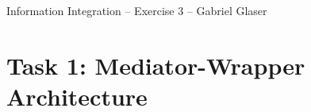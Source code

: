 \documentclass{scrartcl}
\begin{document}
	\begin{center}
		\LARGE
		Information Integration -- Exercise 3 -- Gabriel Glaser
	\end{center}
	
	\section*{Task 1: Mediator-Wrapper Architecture}
	\begin{center}
		\hspace*{-0.3cm}
	\end{center}
\end{document}
